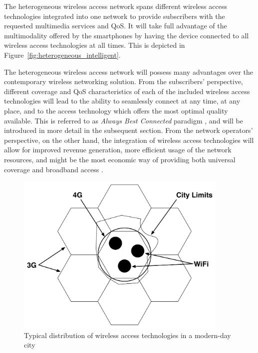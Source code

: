  The heterogeneous wireless access network spans different wireless access technologies integrated into one network to provide subscribers with the requested multimedia services and QoS. It will take full advantage of the multimodality offered by the smartphones by having the device connected to all wireless access technologies at all times. This is depicted in Figure~\ref{fig:heterogeneous_intelligent}.

The heterogeneous wireless access network will possess many advantages over the contemporary wireless networking solution. From the subscribers' perspective, different coverage and QoS characteristics of each of the included wireless access technologies will lead to the ability to seamlessly connect at any time, at any place, and to the access technology which offers the most optimal quality available. This is referred to as \emph{Always Best Connected} paradigm \cite{ABC03}, and will be introduced in more detail in the subsequent section. From the network operators' perspective, on the other hand, the integration of wireless access technologies will allow for improved revenue generation, more efficient usage of the network resources, and might be the most economic way of providing both universal coverage and broadband access \cite{HossainBeaubrun09}.

\begin{figure}[t]
    \centering
    \includegraphics[width=4in]{Intelligent/Figures/wireless_city}
    \caption{Typical distribution of wireless access technologies in a modern-day city}
    \label{fig:wireless_city_intelligent}
\end{figure}

